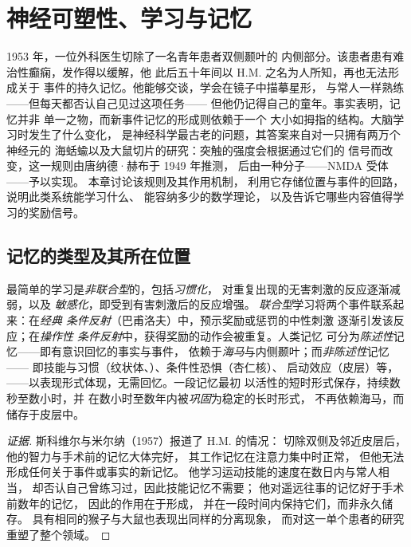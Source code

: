 \chapter{神经可塑性、学习与记忆}\label{ch:b3:learning-memory}

1953 年，一位外科医生切除了一名青年患者双侧颞叶的
内侧部分。该患者患有难治性癫痫，发作得以缓解，他
此后五十年间以 H.M. 之名为人所知，再也无法形成关于
事件的持久记忆。他能够交谈，学会在镜子中描摹星形，
与常人一样熟练——但每天都否认自己见过这项任务——
但他仍记得自己的童年。事实表明，记忆并非
单一之物，而新事件记忆的形成则依赖于一个
大小如拇指的结构。大脑学习时发生了什么变化，
是神经科学最古老的问题，其答案来自对一只拥有两万个神经元的
海蛞蝓以及大鼠切片的研究：突触的强度会根据通过它们的
信号而改变，这一规则由唐纳德·赫布于 1949 年推测，
后由一种分子——NMDA 受体——予以实现。
本章讨论该规则及其作用机制，
利用它存储位置与事件的回路，
说明此类系统能学习什么、
能容纳多少的数学理论，
以及告诉它哪些内容值得学习的奖励信号。

\section{记忆的类型及其所在位置}

\begin{definition}[学习与记忆的形式]\label{def:b3:learning-memory:kinds}
最简单的学习是\emph{非联合型}的，包括\emph{习惯化}，
对重复出现的无害刺激的反应逐渐减弱，以及
\emph{敏感化}，即受到有害刺激后的反应增强。
\emph{联合型}学习将两个事件联系起来：在\emph{经典
条件反射}（巴甫洛夫）中，预示奖励或惩罚的中性刺激
逐渐引发该反应；在\emph{操作性
条件反射}中，获得奖励的动作会被重复。人类记忆
可分为\emph{陈述性}记忆——即有意识回忆的事实与事件，
依赖于\emph{海马}与内侧颞叶；而\emph{非陈述性}记忆——
即技能与习惯（纹状体、）、条件性恐惧（杏仁核）、
启动效应（皮层）等，
——以表现形式体现，无需回忆。一段记忆最初
以活性的短时形式保存，持续数秒至数小时，并
在数小时至数年内被\emph{巩固}为稳定的长时形式，
不再依赖海马，而储存于皮层中。
\end{definition}

\begin{proof}[证据]
斯科维尔与米尔纳（1957）报道了 H.M. 的情况：
切除双侧及邻近皮层后，他的智力与手术前的记忆大体完好，
其工作记忆在注意力集中时正常，
但他无法形成任何关于事件或事实的新记忆。
他学习运动技能的速度在数日内与常人相当，
却否认自己曾练习过，因此技能记忆不需要；
他对遥远往事的记忆好于手术前数年的记忆，
因此的作用在于形成，
并在一段时间内保持它们，而非永久储存。
具有相同的猴子与大鼠也表现出同样的分离现象，
而对这一单个患者的研究
重塑了整个领域。
\end{proof}


